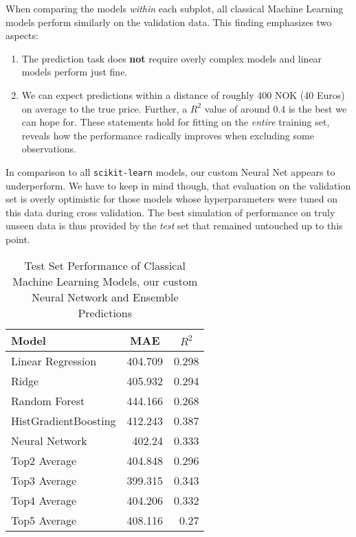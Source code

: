 When comparing the models \emph{within} each subplot, all classical Machine Learning models perform similarly on the validation data.
This finding emphasizes two aspects:
\begin{enumerate}
  \item The prediction task does \textbf{not} require overly complex models and linear models perform just fine.
  \item We can expect predictions within a distance of roughly $400$ NOK (40 Euros) on average to the true price.
        Further, a $R^2$ value of around $0.4$ is the best we can hope for.
        These statements hold for fitting on the \emph{entire} training set,  reveals how the performance radically improves when excluding some observations.
\end{enumerate}
In comparison to all \texttt{scikit-learn} models, our custom Neural Net appears to underperform.
We have to keep in mind though, that evaluation on the validation set is overly optimistic for those models whose hyperparameters were tuned on this data during cross validation.
The best simulation of performance on truly unseen data is thus provided by the \emph{test} set that remained untouched up to this point.

\begin{table}[th]
  \centering
  \begin{tabular}{lrr}
    \hline
    Model                & \multicolumn{1}{c}{MAE} & \multicolumn{1}{c}{$R^2$} \\ \hline
    Linear Regression    & 404.709                 & 0.298                     \\
    Ridge                & 405.932                 & 0.294                     \\
    Random Forest        & 444.166                 & 0.268                     \\
    HistGradientBoosting & 412.243                 & 0.387                     \\
    Neural Network       & 402.24                  & 0.333                     \\
    Top2 Average         & 404.848                 & 0.296                     \\
    Top3 Average         & 399.315                 & 0.343                     \\
    Top4 Average         & 404.206                 & 0.332                     \\
    Top5 Average         & 408.116                 & 0.27                      \\ \hline
  \end{tabular}
  \caption{Test Set Performance of Classical Machine Learning Models, our custom Neural Network and Ensemble Predictions}
  \label{tab:test-set}
\end{table}

